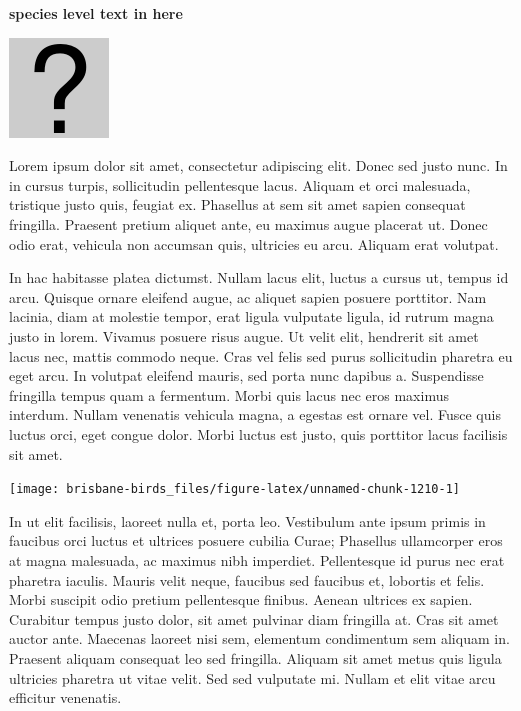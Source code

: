 \documentclass[]{book}
\let\origfigure\figure
\let\endorigfigure\endfigure
\renewenvironment{figure}[1][2] {
  \expandafter\origfigure\expandafter[H]
} {
  \endorigfigure
}
\begin{document}
\textbf{species level text in here}

\begin{figure}
\centering
\includegraphics{assets/missing.png}
\caption{No image for species}
\end{figure}

Lorem ipsum dolor sit amet, consectetur adipiscing elit. Donec sed justo
nunc. In in cursus turpis, sollicitudin pellentesque lacus. Aliquam et
orci malesuada, tristique justo quis, feugiat ex. Phasellus at sem sit
amet sapien consequat fringilla. Praesent pretium aliquet ante, eu
maximus augue placerat ut. Donec odio erat, vehicula non accumsan quis,
ultricies eu arcu. Aliquam erat volutpat.

In hac habitasse platea dictumst. Nullam lacus elit, luctus a cursus ut,
tempus id arcu. Quisque ornare eleifend augue, ac aliquet sapien posuere
porttitor. Nam lacinia, diam at molestie tempor, erat ligula vulputate
ligula, id rutrum magna justo in lorem. Vivamus posuere risus augue. Ut
velit elit, hendrerit sit amet lacus nec, mattis commodo neque. Cras vel
felis sed purus sollicitudin pharetra eu eget arcu. In volutpat eleifend
mauris, sed porta nunc dapibus a. Suspendisse fringilla tempus quam a
fermentum. Morbi quis lacus nec eros maximus interdum. Nullam venenatis
vehicula magna, a egestas est ornare vel. Fusce quis luctus orci, eget
congue dolor. Morbi luctus est justo, quis porttitor lacus facilisis sit
amet.

\begin{figure}
\texttt{[image: brisbane-birds\_files/figure-latex/unnamed-chunk-1210-1]} \caption{insert figure caption}\label{fig:unnamed-chunk-1210}
\end{figure}

In ut elit facilisis, laoreet nulla et, porta leo. Vestibulum ante ipsum
primis in faucibus orci luctus et ultrices posuere cubilia Curae;
Phasellus ullamcorper eros at magna malesuada, ac maximus nibh
imperdiet. Pellentesque id purus nec erat pharetra iaculis. Mauris velit
neque, faucibus sed faucibus et, lobortis et felis. Morbi suscipit odio
pretium pellentesque finibus. Aenean ultrices ex sapien. Curabitur
tempus justo dolor, sit amet pulvinar diam fringilla at. Cras sit amet
auctor ante. Maecenas laoreet nisi sem, elementum condimentum sem
aliquam in. Praesent aliquam consequat leo sed fringilla. Aliquam sit
amet metus quis ligula ultricies pharetra ut vitae velit. Sed sed
vulputate mi. Nullam et elit vitae arcu efficitur venenatis.
\end{document}
